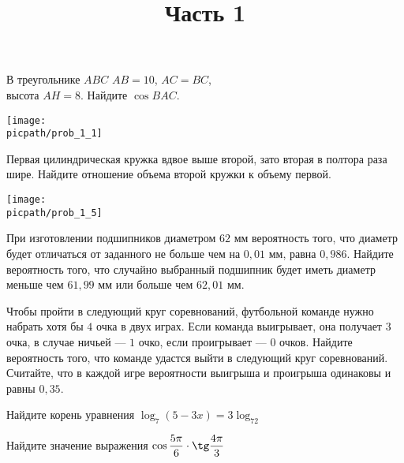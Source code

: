 %
%

\begin{training}[1]
	\title{Часть 1}
	\egepreambone
	\begin{listofex}
		\item
		\begin{minipage}[t]{\bodywidth}
			В треугольнике \( ABC \) \( AB=10 \), \( AC=BC \),\\
			высота \( AH=8 \). Найдите \( \cos BAC \).
			\foranswer
		\end{minipage}
		\gapwidth
		\begin{minipage}[t]{\picwidth}
			\texttt{[image: \\picpath/prob\_1\_1]}
		\end{minipage}
		\item
		\begin{minipage}[t]{\bodywidth}
			Первая цилиндрическая кружка вдвое
			выше второй, зато вторая в полтора раза
			шире. Найдите отношение объема второй
			кружки к объему первой.
			\foranswer
		\end{minipage}
		\gapwidth
		\begin{minipage}[t]{\picwidth}
			\texttt{[image: \\picpath/prob\_1\_5]}
		\end{minipage}
		\item При изготовлении подшипников диаметром \( 62 \) мм
		вероятность того, что диаметр будет отличаться от заданного
		не больше чем на \( 0, 01 \) мм, равна \( 0, 986 \).
		Найдите вероятность того, что случайно выбранный подшипник
		будет иметь диаметр меньше чем \( 61, 99 \) мм
		или больше чем \( 62, 01 \) мм.
		\foranswer
		\item Чтобы пройти в следующий круг соревнований,
		футбольной команде нужно набрать хотя бы \( 4 \) очка в двух играх.
		Если команда выигрывает, она получает \( 3 \) очка,
		в случае ничьей --- \( 1 \) очко, если проигрывает --- \( 0 \) очков.
		Найдите вероятность того, что команде удастся выйти в следующий круг соревнований.
		Считайте, что в каждой игре вероятности выигрыша и
		проигрыша одинаковы и равны \( 0,35 \).
		\item Найдите корень уравнения \( \log_7(5-3x)=3\log_72 \)
		\foranswer
	\end{listofex}
	\newpage
	\phantom{Часть 1}
	\begin{listofex}[resume]
		\item Найдите значение выражения \( \cos\dfrac{5\pi}{6}\cdot\tg\dfrac{4\pi}{3} \)

\end{listofex}
\end{training}
